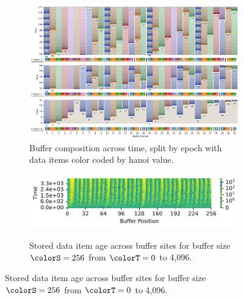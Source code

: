 \begin{figure}[htbp!]
  \centering

\begin{subfigure}[b]{\linewidth}
\includegraphics[width=\linewidth]{
binder/teeplots/20/num-generations=128+surface-size=32+viz=site-reservation-by-rank-spliced-at-heatmap+ext=}
\vspace{-4ex}\caption{
  Buffer composition across time, split by epoch with data items color coded by hanoi value.
}
\label{fig:hsurf-tilted-implementation-schematic}
\end{subfigure}

\vspace{1ex}\begin{minipage}[]{\textwidth}
 \vspace{-2pt}
  \begin{subfigure}[t]{0.7\linewidth}
    \vspace{0pt}
    \centering
  \includegraphics[width=0.88\linewidth,clip]{binder/teeplots/20/cnorm=log+num-generations=4096+surface-size=256+viz=site-ingest-depth-by-rank-heatmap+ynorm=linear+ext=}
  \end{subfigure}%
  \begin{subfigure}[t]{0.3\linewidth}
  \vspace{-2pt}
  \caption{%
    Stored data item age across buffer sites for buffer size $\colorS=256$ from $\colorT=0$ to 4,096.
  }
  \label{fig:hsurf-tilted-implementation-heatmap}
\end{subfigure}
\end{minipage}


\end{figure}
